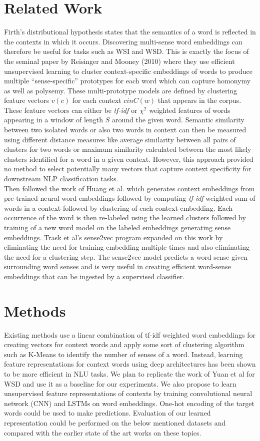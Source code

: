 \documentclass{article}
\begin{document}
\section{Related Work}
Firth’s distributional hypothesis states that the semantics of a word is reflected in the contexts in which it occurs. Discovering multi-sense word embeddings can therefore be useful for tasks such as WSI and WSD. This is exactly the focus of the seminal paper by Reisinger and Mooney (2010) where they use efficient unsupervised learning to cluster context-specific embeddings of words to produce multiple “sense-specific” prototypes for each word which can capture homonymy as well as polysemy. These multi-prototype models are defined by clustering feature vectors $v(c)$ for each context $c in C(w)$ that appears in the corpus. These feature vectors can either be \textit{tf-idf} or $\chi^2$ weighted features of words appearing in a window of length $S$ around the given word. Semantic similarity between two isolated words or also two words in context can then be measured using different distance measures like average similarity between all pairs of clusters for two words or maximum similarity calculated between the most likely clusters identified for a word in a given context. However, this approach provided no method to select potentially many vectors that capture context specificity for downstream NLP classification tasks.\\
Then followed the work of Huang et al. which generates context embeddings from pre-trained neural word embeddings followed by computing \textit{tf-idf} weighted sum of words in a context followed by clustering of each context embedding. Each occurrence of the word is then re-labeled using the learned clusters followed by training of a new word model on the labeled embeddings generating sense embeddings. Trask et al’s sense2vec program expanded on this work by eliminating the need for training embedding multiple times and also eliminating the need for a clustering step. The sense2vec model predicts a word sense given surrounding word senses and is very useful in creating efficient word-sense embeddings that can be ingested by a supervised classifier.


\section{Methods}
Existing methods use a linear combination of tf-idf weighted word embeddings for creating vectors for context words and apply some sort of clustering algorithm such as K-Means to identify the number of senses of a word. Instead, learning feature representations for context words using deep architectures has been shown to be more efficient in NLU tasks. We plan to replicate the work of Yuan et al \cite{yuan2016word} for WSD and use it as a baseline for our experiments. We also propose to learn unsupervised feature representations of contexts by training convolutional neural network (CNN) and LSTMs on word embeddings. One-hot encoding of the target words could be used to make predictions. Evaluation of our learned representation could be performed on the below mentioned datasets and compared with the earlier state of the art works on these topics.
\end{document}
